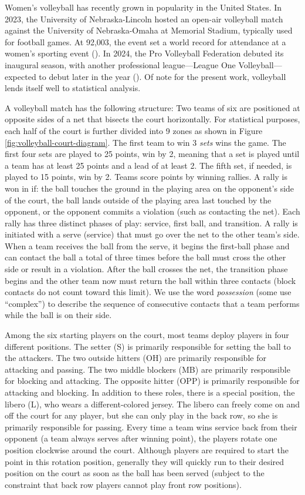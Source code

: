 \documentclass[USenglish]{article}
\theoremstyle{dgthm}
\theoremstyle{dgdef}
\begin{document}
Women's volleyball has recently grown in popularity in the United States. In 2023, the University of Nebraska-Lincoln hosted an open-air volleyball match against the University of Nebraska-Omaha at Memorial Stadium, typically used for football games. At 92,003, the event set a world record for attendance at a women's sporting event (\cite{olson_2023}). In 2024, the Pro Volleyball Federation debuted its inaugural season, with another professional league---League One Volleyball---expected to debut later in the year (\cite{echlin_2024}). Of note for the present work, volleyball lends itself well to statistical analysis.

A volleyball match has the following structure: Two teams of six are positioned at opposite sides of a net that bisects the court horizontally. For statistical purposes, each half of the court is further divided into 9 zones as shown in Figure \ref{fig:volleyball-court-diagram}. The first team to win 3 {\it sets} wins the game. The first four sets are played to 25 points, win by 2, meaning that a set is played until a team has at least 25 points and a lead of at least 2. The fifth set, if needed, is played to 15 points, win by 2. Teams score points by winning rallies. A rally is won in if: the ball touches the ground in the playing area on the opponent's side of the court, the ball lands outside of the playing area last touched by the opponent, or the opponent commits a violation (such as contacting the net). Each rally has three distinct phases of play: service, first ball, and transition. A rally is initiated with a serve (service) that must go over the net to the other team's side. When a team receives the ball from the serve, it begins the first-ball phase and can contact the ball a total of three times before the ball must cross the other side or result in a violation. After the ball crosses the net, the transition phase begins and the other team now must return the ball within three contacts (block contacts do not count toward this limit). We use the word {\it possession} (some use ``complex'') to describe the sequence of consecutive contacts that a team performs while the ball is on their side.

Among the six starting players on the court, most teams deploy players in four different positions. The setter (S) is primarily responsible for setting the ball to the attackers. The two outside hitters (OH) are primarily responsible for attacking and passing. The two middle blockers (MB) are primarily responsible for blocking and attacking. The opposite hitter (OPP) is primarily responsible for attacking and blocking. In addition to these roles, there is a special position, the libero (L), who wears a different-colored jersey. The libero can freely come on and off the court for any player, but she can only play in the back row, so she is primarily responsible for passing. Every time a team wins service back from their opponent (a team always serves after winning point), the players rotate one position clockwise around the court. Although players are required to start the point in this rotation position, generally they will quickly run to their desired position on the court as soon as the ball has been served (subject to the constraint that back row players cannot play front row positions).
\end{document}
